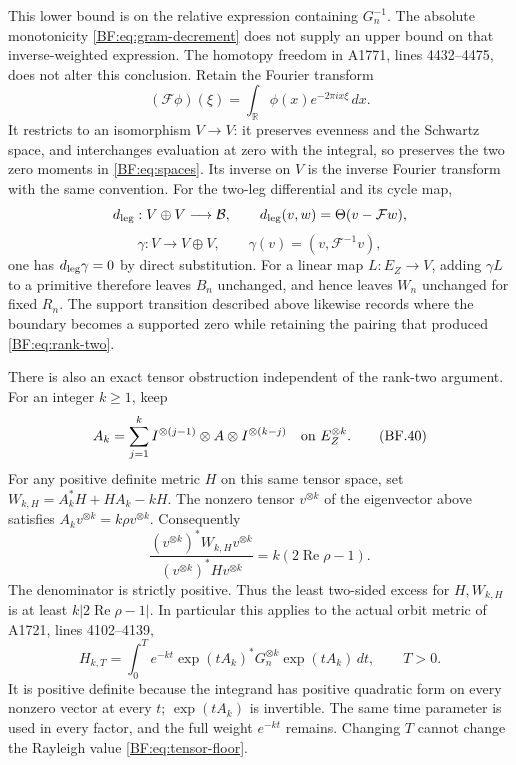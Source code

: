 This lower bound is on the relative expression containing
\(G_n^{-1}\).  The absolute monotonicity
\eqref{BF:eq:gram-decrement} does not supply an upper bound on
that inverse-weighted expression.
The homotopy freedom in A1771, lines 4432--4475, does not alter
this conclusion.  Retain the Fourier transform
\[
(\mathcal F\phi)(\xi)
 =\int_{\mathbb R}\phi(x)e^{-2\pi ix\xi}\,dx.
\]
It restricts to an isomorphism \(V\to V\): it preserves evenness
and the Schwartz space, and interchanges evaluation at zero with
the integral, so preserves the two zero moments in
\eqref{BF:eq:spaces}.  Its inverse on \(V\) is the inverse Fourier
transform with the same convention.
For the two-leg differential and its cycle map,
\[
d_{\rm leg}:V\oplus V\longrightarrow\mathcal B,\qquad
d_{\rm leg}(v,w)=\Theta(v-\mathcal Fw),
\]
\[
\gamma:V\longrightarrow V\oplus V,\qquad
\gamma(v)=(v,\mathcal F^{-1}v),
\]
one has \(d_{\rm leg}\gamma=0\) by direct substitution.
For a linear map \(L:E_Z\to V\), adding \(\gamma L\) to a
primitive therefore leaves \(B_n\)
unchanged, and hence leaves \(W_n\) unchanged for fixed \(R_n\).
The support transition described above likewise records where
the boundary becomes a supported zero while retaining the
pairing that produced \eqref{BF:eq:rank-two}.

There is also an exact tensor obstruction independent of the
rank-two argument.  For an integer \(k\ge1\), keep
\begin{equation}
A_k=\sum_{j=1}^k
 I^{\otimes(j-1)}\otimes A\otimes I^{\otimes(k-j)}
 \quad\hbox{on }E_Z^{\otimes k}.
\tag{BF.40}\label{BF:eq:tensor-generator}
\end{equation}
For any positive definite metric \(H\) on this same tensor
space, set \(W_{k,H}=A_k^*H+HA_k-kH\).
The nonzero tensor \(v^{\otimes k}\) of the eigenvector above
satisfies \(A_kv^{\otimes k}=k\rho v^{\otimes k}\).
Consequently
\begin{equation}
\frac{(v^{\otimes k})^*W_{k,H}v^{\otimes k}}
     {(v^{\otimes k})^*H v^{\otimes k}}
 =k(2\operatorname{Re}\rho-1).
\tag{BF.41}\label{BF:eq:tensor-floor}
\end{equation}
The denominator is strictly positive.
Thus the least two-sided excess for \(H,W_{k,H}\) is at least
\(k|2\operatorname{Re}\rho-1|\).
In particular this applies to the actual orbit metric of
A1721, lines 4102--4139,
\[
H_{k,T}
 =\int_0^T e^{-kt}\exp(tA_k)^*G_n^{\otimes k}
                       \exp(tA_k)\,dt,\qquad T>0.
\]
It is positive definite because the integrand has positive
quadratic form on every nonzero vector at every \(t\);
\(\exp(tA_k)\) is invertible.
The same time parameter is used in every factor, and the full
weight \(e^{-kt}\) remains.  Changing \(T\) cannot change the
Rayleigh value \eqref{BF:eq:tensor-floor}.

